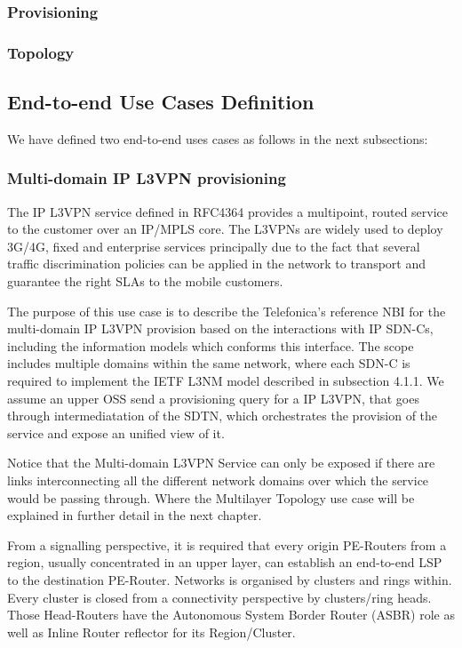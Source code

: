 \documentclass[a4paper,fleqn]{cas-dc}
\begin{document}
\subsubsection{Provisioning}

\subsubsection{Topology}

\subsection{End-to-end Use Cases Definition}
We have defined two end-to-end uses cases as follows in the next subsections:

\subsubsection{Multi-domain IP L3VPN provisioning}
The IP L3VPN service defined in RFC4364 \cite{rfc4364} provides a multipoint, routed service to the customer over an IP/MPLS core. The L3VPNs are widely used to deploy 3G/4G, fixed and enterprise services principally due to the fact that several traffic discrimination policies can be applied in the network to transport and guarantee the right SLAs to the mobile customers.

The purpose of this use case is to describe the Telefonica’s reference NBI for the multi-domain IP L3VPN provision based on the interactions with IP SDN-Cs, including the information models which conforms this interface. The scope includes multiple domains within the same network, where each SDN-C is required to implement the IETF L3NM model described in subsection 4.1.1. We assume an upper OSS send a provisioning query for a IP L3VPN,  that goes through intermediatation of the SDTN, which orchestrates the provision of the service and expose an unified view of it.

Notice that the Multi-domain L3VPN Service can only be exposed if there are links interconnecting all the different network domains over which the service would be passing through. Where the Multilayer Topology use case will be explained in further detail in the next chapter. 

From a signalling perspective, it is required that every origin PE-Routers from a region, usually concentrated in an upper layer, can establish an end-to-end LSP to the destination PE-Router. Networks is organised by clusters and rings within. Every cluster is closed from a connectivity perspective by clusters/ring heads. Those Head-Routers have the Autonomous System Border Router (ASBR) role as well as Inline Router reflector for its Region/Cluster. 
\end{document}
